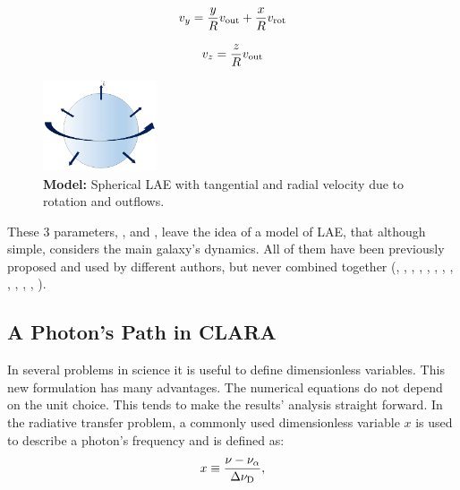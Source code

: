 \documentclass{latex/emulateapj}
\begin{document}
\begin{equation}
	v_{y}=\frac{y}{R}v_{\rm out}+\frac{x}{R}v_{\rm rot} 
	\label{eq:vy}
\end{equation}

\begin{equation}
	v_{z}=\frac{z}{R}v_{\rm out}
	\label{eq:vz}
\end{equation}

\begin{figure}[h!]
	\begin{center}
		\includegraphics[width=0.3\textwidth]{./figures/model}
	\end{center}
	\caption{\textbf{Model:} Spherical LAE with tangential and radial velocity due to rotation and outflows.
		\label{fig:model}}
\end{figure}

These 3 parameters, \vrot, \vout and \tauh, leave the idea of a model of LAE, that although simple, considers the main galaxy's dynamics. All of them have been previously proposed and used by different authors, but never combined together (\cite{Adams72}, \cite{Harrington73}, \cite{Neufeld90}, \cite{Dijkstra06}, \cite{Verhamme06}, \cite{Forero12}, \cite{Martin2015}, \cite{Garavito14}, \cite{Neufeld91}, \cite{Laursen09}, \cite{Barnes11}, \cite{Verhamme12}, \cite{Yajima12}).\\

\subsection{A \lya Photon's Path in CLARA}
In several problems in science it is useful to define dimensionless variables. This new formulation has many advantages. The numerical equations do not depend on the unit choice. This tends to make the results' analysis straight forward. In the \lya radiative transfer problem, a commonly used dimensionless variable $x$ is used to describe a photon's frequency and is defined as:\\

\begin{equation}
	\label{eq:x_freq}
	x \equiv \frac{\nu -\nu_{\rm \alpha}}{\Delta\nu_{\rm D}},
\end{equation} 
\end{document}
